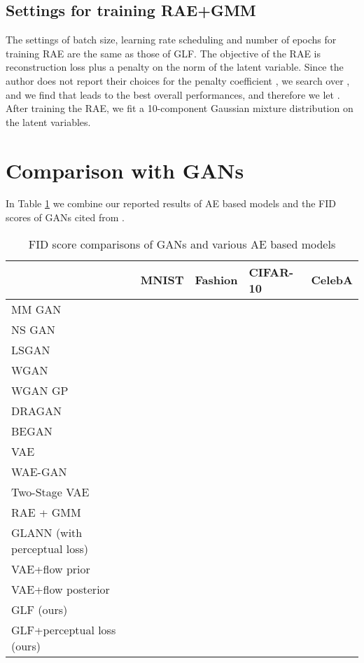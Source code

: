 \documentclass{article}
\begin{document}
\subsection{Settings for training RAE+GMM}
The settings of batch size, learning rate scheduling and number of epochs for training RAE are the same as those of GLF. The objective of the RAE is reconstruction loss plus a penalty on the norm of the latent variable. Since the author does not report their choices for the penalty coefficient , we search over , and we find that  leads to the best overall performances, and therefore we let . After training the RAE, we fit a 10-component Gaussian mixture distribution on the latent variables.

\section{Comparison with GANs} \label{GAN compare}
In Table \ref{FID_GAN} we combine our reported results of AE based models and the FID scores of GANs cited from \citep{AreGan}.

\begin{table}
  \caption{FID score comparisons of GANs and various AE based models}
  \label{FID_GAN}
  \centering
  \begin{tabular}{lllll}
    \toprule
        & MNIST  &Fashion   & CIFAR-10 & CelebA \\
    \midrule
      MM GAN &  &  &  &  \\
	 NS GAN &  &  &  &   \\
	 LSGAN &  &  &  &   \\
	 WGAN &  &  &  &    \\
	 WGAN GP &  &  &  &   \\
	 DRAGAN &  &  &  &   \\
	 BEGAN &  &  &  &   \\
	 \midrule
	 VAE &  &  &  & \\
	 WAE-GAN  &  &  &  & \\
	 Two-Stage VAE &  &  &  &  \\
	 RAE + GMM  &  &  &  & \\
	 GLANN (with perceptual loss) &  &  &  &  \\
	 VAE+flow prior &  &  &  & \\
	 VAE+flow posterior &  &  &  & \\
	 GLF (ours) &  &  &  &  \\
	 GLF+perceptual loss (ours) & &  &  & \\
    \bottomrule
  \end{tabular}
\end{table}
\end{document}
